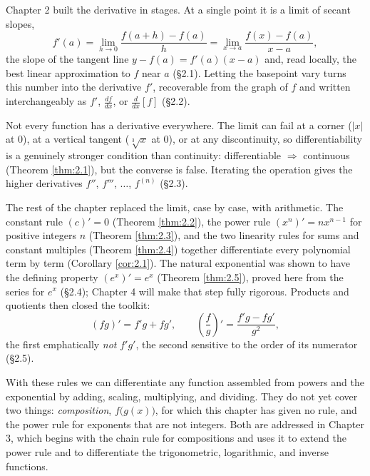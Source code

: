 \documentclass[a4paper,12pt,oneside]{memoir}
\begin{document}
Chapter 2 built the derivative in stages. At a single point it is a limit of secant slopes, \[ f'(a) = \lim_{h \to 0} \frac{f(a + h) - f(a)}{h} = \lim_{x \to a} \frac{f(x) - f(a)}{x - a}, \] the slope of the tangent line \(y - f(a) = f'(a)(x - a)\) and, read locally, the best linear approximation to \(f\) near \(a\) (§2.1). Letting the basepoint vary turns this number into the derivative \(f'\), recoverable from the graph of \(f\) and written interchangeably as \(f'\), \(\tfrac{df}{dx}\), or \(\tfrac{d}{dx}[f]\) (§2.2).

Not every function has a derivative everywhere. The limit can fail at a corner (\(\lvert x \rvert\) at \(0\)), at a vertical tangent (\(\sqrt[3]{x}\) at \(0\)), or at any discontinuity, so differentiability is a genuinely stronger condition than continuity: differentiable \(\Rightarrow\) continuous (Theorem \ref{thm:2.1}), but the converse is false. Iterating the operation gives the higher derivatives \(f''\), \(f'''\), \(\dots\), \(f^{(n)}\) (§2.3).

The rest of the chapter replaced the limit, case by case, with arithmetic. The constant rule \((c)' = 0\) (Theorem \ref{thm:2.2}), the power rule \((x^{n})' = n x^{n - 1}\) for positive integers \(n\) (Theorem \ref{thm:2.3}), and the two linearity rules for sums and constant multiples (Theorem \ref{thm:2.4}) together differentiate every polynomial term by term (Corollary \ref{cor:2.1}). The natural exponential was shown to have the defining property \((e^{x})' = e^{x}\) (Theorem \ref{thm:2.5}), proved here from the series for \(e^{x}\) (§2.4); Chapter 4 will make that step fully rigorous. Products and quotients then closed the toolkit: \[ (fg)' = f'g + fg', \qquad \left(\frac{f}{g}\right)' = \frac{f'g - fg'}{g^{2}}, \] the first emphatically \emph{not} \(f'g'\), the second sensitive to the order of its numerator (§2.5).

With these rules we can differentiate any function assembled from powers and the exponential by adding, scaling, multiplying, and dividing. They do not yet cover two things: \emph{composition}, \(f\bigl(g(x)\bigr)\), for which this chapter has given no rule, and the power rule for exponents that are not integers. Both are addressed in Chapter 3, which begins with the chain rule for compositions and uses it to extend the power rule and to differentiate the trigonometric, logarithmic, and inverse functions.
\end{document}
